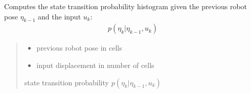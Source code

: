 \documentclass[letterpaper,10pt,english]{sphinxmanual}
\begin{document}
\begin{fulllineitems}
\begin{fulllineitems}
\begin{quote}
\begin{description}
\end{description}\end{quote}

\end{fulllineitems}


\begin{fulllineitems}
\label{\detokenize{GridLocalization:GL_3DOFDifferentialDrive.GL_3DOFDifferentialDrive.StateTransitionProbability_4_xk_1_uk}}
\pysigstartsignatures
{}
\pysigstopsignatures
\sphinxAtStartPar
Computes the state transition probability histogram given the previous robot pose \(\eta_{k-1}\) and the input \(u_k\):
\begin{equation*}
\begin{split}p(\eta_k | \eta_{k-1}, u_k)\end{split}
\end{equation*}\begin{quote}\begin{description}
\begin{itemize}
\item {} 
\sphinxAtStartPar
{} \textendash{} previous robot pose in cells

\item {} 
\sphinxAtStartPar
{} \textendash{} input displacement in number of cells

\end{itemize}

\sphinxAtStartPar
state transition probability \(p(\eta_k | \eta_{k-1}, u_k)\)

\end{description}\end{quote}

\end{fulllineitems}



\end{fulllineitems}
\end{document}
